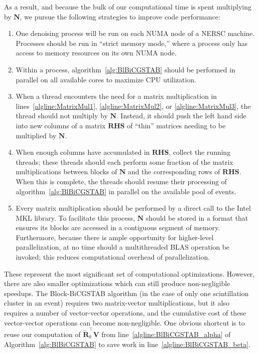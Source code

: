 As a result, and because the bulk of our computational time is spent multiplying by $\mathbf{N}$, we pursue the following strategies to improve code performance:
\begin{enumerate}
\item One denoising process will be run on each NUMA node of a NERSC machine.  Processes should be run in ``strict memory mode,'' where a process only has access to memory resources on its own NUMA node.
\item Within a process, algorithm~\ref{alg:BlBiCGSTAB} should be performed in parallel on all available cores to maximize CPU utilization.
\item When a thread encounters the need for a matrix multiplication in lines~\ref{algline:MatrixMul1}, \ref{algline:MatrixMul2}, or \ref{algline:MatrixMul3}, the thread should not multiply by $\mathbf{N}$.  Instead, it should push the left hand side into new columns of a matrix $\mathbf{RHS}$ of ``thin'' matrices needing to be multiplied by $\mathbf{N}$.
\item When enough columns have accumulated in $\mathbf{RHS}$, collect the running threads; these threads should each perform some fraction of the matrix multiplications between blocks of $\mathbf{N}$ and the corresponding rows of $\mathbf{RHS}$.  When this is complete, the threads should resume their processing of algorithm~\ref{alg:BlBiCGSTAB} in parallel on the available pool of events.
\item Every matrix multiplication should be performed by a direct call to the Intel MKL library.  To facilitate this process, $\mathbf{N}$ should be stored in a format that ensures its blocks are accessed in a contiguous segment of memory.  Furthermore, because there is ample opportunity for higher-level parallelization, at no time should a multithreaded BLAS operation be invoked; this reduces computational overhead of parallelization.
\end{enumerate}

These represent the most significant set of computational optimizations.  However, there are also smaller optimizations which can still produce non-negligible speedups.  The Block-BiCGSTAB algorithm (in the case of only one scintillation cluster in an event) requires two matrix-vector multiplications, but it also requires a number of vector-vector operations, and the cumulative cost of these vector-vector operations can become non-negligible.  One obvious shortcut is to reuse our computation of $\mathbf{\widetilde{R}}_0^\top \mathbf{V}$ from line~\ref{algline:BlBiCGSTAB_alpha} of Algorithm~\ref{alg:BlBiCGSTAB} to save work in line~\ref{algline:BlBiCGSTAB_beta}.

